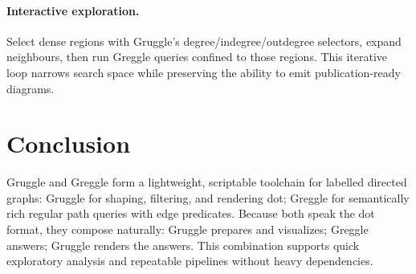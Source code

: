 \documentclass[11pt]{article}
\begin{document}
\paragraph{Interactive exploration.} Select dense regions with Gruggle's degree/indegree/outdegree selectors, expand neighbours, then run Greggle queries confined to those regions. This iterative loop narrows search space while preserving the ability to emit publication-ready diagrams.

\section{Conclusion}

Gruggle and Greggle form a lightweight, scriptable toolchain for labelled directed graphs: Gruggle for shaping, filtering, and rendering dot; Greggle for semantically rich regular path queries with edge predicates. Because both speak the dot format, they compose naturally: Gruggle prepares and visualizes; Greggle answers; Gruggle renders the answers. This combination supports quick exploratory analysis and repeatable pipelines without heavy dependencies.



\end{document}
